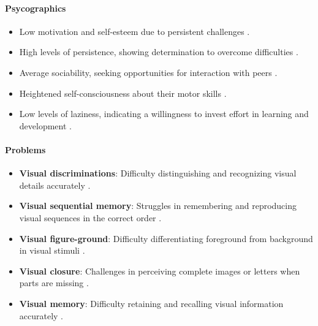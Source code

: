 \paragraph{Psycographics}
\begin{itemize}
    \item Low motivation and self-esteem due to persistent challenges \cite{ChildDevelopment}.
    \item High levels of persistence, showing determination to overcome difficulties \cite{Speechify}.
    \item Average sociability, seeking opportunities for interaction with peers \cite{PorterAcademy}.
    \item Heightened self-consciousness about their motor skills \cite{Speechify}.
    \item Low levels of laziness, indicating a willingness to invest effort in learning and development \cite{PorterAcademy}.
\end{itemize}

\paragraph{Problems}
\begin{itemize}
    \item \textbf{Visual discriminations}: Difficulty distinguishing and recognizing visual details accurately \cite{ChildDevelopment}.
    \item \textbf{Visual sequential memory}: Struggles in remembering and reproducing visual sequences in the correct order \cite{PorterAcademy}.
    \item \textbf{Visual figure-ground}: Difficulty differentiating foreground from background in visual stimuli \cite{ScienceDaily}.
    \item \textbf{Visual closure}: Challenges in perceiving complete images or letters when parts are missing \cite{Speechify}.
    \item \textbf{Visual memory}: Difficulty retaining and recalling visual information accurately \cite{PorterAcademy}.
\end{itemize}

